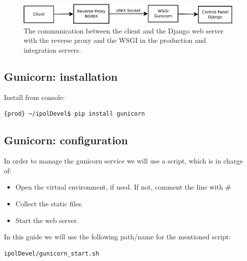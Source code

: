 \documentclass[a4paper,12pt]{article}
\begin{document}
\begin{figure}[!ht]
\centering
\includegraphics[width=1\columnwidth]{images/prod_int}
\caption{The communication between the client and the Django web server with the reverse proxy and the WSGI in the production and integration servers.}
\label{fig:prod_int_architecture}
\end{figure}


\subsection{Gunicorn: installation}

Install from console:
\begin{lstlisting}[language=Bash]
{prod} ~/ipolDevel$ pip install gunicorn
\end{lstlisting}

\subsection{Gunicorn: configuration}
In order to manage the gunicorn service we will use a script, which is in charge of:
\begin{itemize}
\item Open the virtual environment, if used. If not, comment the line with \#
\item Collect the static files.
\item Start the web server.
\end{itemize}

In this guide we will use the following path/name for the mentioned script:
\begin{lstlisting}[language=Bash]
ipolDevel/gunicorn_start.sh
\end{lstlisting}
\end{document}
